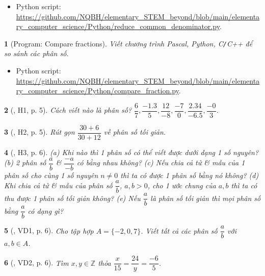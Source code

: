 \documentclass{article}
\newtheorem{baitoan}{}
\begin{document}
\begin{itemize}
	\item Python script: \url{https://github.com/NQBH/elementary_STEM_beyond/blob/main/elementary_computer_science/Python/reduce_common_denominator.py}.
\end{itemize}

\begin{baitoan}[{\sf Program}: Compare fractions]
	Viết chương trình {\sf Pascal, Python, C{\tt/}C++} để so sánh các phân số.
\end{baitoan}

\begin{itemize}
	\item Python script: \url{https://github.com/NQBH/elementary_STEM_beyond/blob/main/elementary_computer_science/Python/compare_fraction.py}.
\end{itemize}

\begin{baitoan}[\cite{Binh_boi_duong_Toan_6_tap_2}, H1, p. 5]
	Cách viết nào là phân số? $\dfrac{6}{7},\dfrac{-1.3}{5},\dfrac{12}{-8},\dfrac{-7}{0},\dfrac{2.34}{-6.5},\dfrac{-0}{3}$.
\end{baitoan}

\begin{baitoan}[\cite{Binh_boi_duong_Toan_6_tap_2}, H2, p. 5]
	Rút gọn $\dfrac{30 + 6}{30 + 12}$ về phân số tối giản.
\end{baitoan}

\begin{baitoan}[\cite{Binh_boi_duong_Toan_6_tap_2}, H3, p. 6]
	(a) Khi nào thì 1 phân số có thể viết được dưới dạng 1 số nguyên? (b) 2 phân số $\dfrac{a}{b}$ \& $\dfrac{-a}{-b}$ có bằng nhau không? (c) Nếu chia cả tử \& mẫu của 1 phân số cho cùng 1 số nguyên $n\ne0$ thì ta có được 1 phân số bằng nó không? (d) Khi chia cả tử \& mẫu của phân số $\dfrac{a}{b}$, $a,b > 0$, cho 1 ước chung của $a,b$ thì ta có thu được 1 phân số tối giản không? (e) Nếu $\dfrac{a}{b}$ là phân số tối giản thì mọi phân số bằng $\dfrac{a}{b}$ có dạng gì?
\end{baitoan}

\begin{baitoan}[\cite{Binh_boi_duong_Toan_6_tap_2}, VD1, p. 6]
	Cho tập hợp $A = \{-2,0,7\}$. Viết tất cả các phân số $\dfrac{a}{b}$ với $a,b\in A$.
\end{baitoan}

\begin{baitoan}[\cite{Binh_boi_duong_Toan_6_tap_2}, VD2, p. 6]
	Tìm $x,y\in\mathbb{Z}$ thỏa $\dfrac{x}{15} = \dfrac{24}{y} = \dfrac{-6}{5}$.
\end{baitoan}
\end{document}

